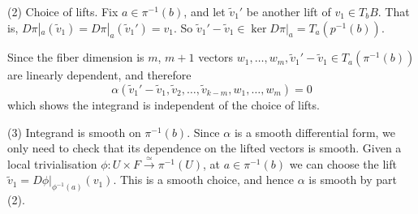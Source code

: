 (2) Choice of lifts. Fix $a\in \pi^{-1}(b)$, and let $\widetilde{v}_1'$ be 
another lift of $v_1\in T_bB$. That is, 
$D\pi|_a(\widetilde{v}_1)=D\pi|_a(\widetilde{v}_1')=v_1$. So
$\widetilde{v}_1'-\widetilde{v}_1\in \ker D\pi|_a = T_a(p^{-1}(b))$.  

Since the fiber dimension is $m$, $m+1$ vectors 
$w_1,\ldots,w_m,\widetilde{v}_1'-\widetilde{v}_1 \in T_a(\pi^{-1}(b))$ are
linearly dependent, and therefore 
\[
\alpha(\widetilde{v}_1'-\widetilde{v}_1,
\widetilde{v}_2,\ldots,\widetilde{v}_{k-m},w_1,\ldots,w_m) = 0
\] 
which shows the integrand is independent of the choice of lifts.

(3) Integrand is smooth on $\pi^{-1}(b)$. Since $\alpha$ is a smooth 
differential form, we only need to check that its dependence on the lifted 
vectors is smooth. Given a local trivialisation $\phi : U\times F
\xrightarrow{\simeq} \pi^{-1}(U)$, at $a\in\pi^{-1}(b)$ we can choose the lift 
$\widetilde{v}_1 = D\phi|_{\phi^{-1}(a)}(v_1)$. This is a smooth choice, and
hence $\alpha$ is smooth by part (2). 

